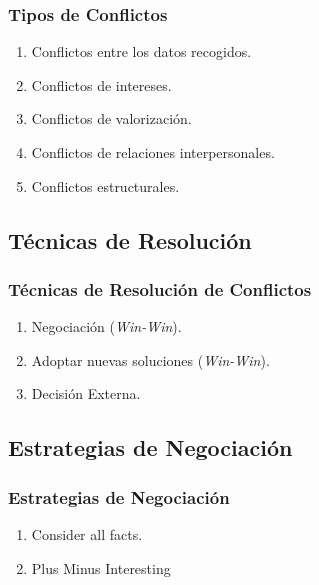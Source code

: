 \documentclass[handout,a4paper,slidestop,xcolor=pst,dvips,blue]{beamer}
\begin{document}
\begin{frame}[c]
    \frametitle{Tipos de Conflictos}
    \begin{enumerate}
        \item Conflictos entre los datos recogidos.
        \item Conflictos de intereses.
        \item Conflictos de valorización.
        \item Conflictos de relaciones interpersonales.
        \item Conflictos estructurales.
    \end{enumerate}
\end{frame}

\subsection{Técnicas de Resolución}

\begin{frame}[c]
    \frametitle{Técnicas de Resolución de Conflictos}
    \begin{enumerate}
        \item Negociación (\emph{Win-Win}).
        \item Adoptar nuevas soluciones (\emph{Win-Win}).
        \item Decisión Externa.
    \end{enumerate}
\end{frame}

\subsection{Estrategias de Negociación}

\begin{frame}[c]
    \frametitle{Estrategias de Negociación}
    \begin{enumerate}
        \item Consider all facts.
        \item Plus Minus Interesting
    \end{enumerate}
\end{frame}
\end{document}

